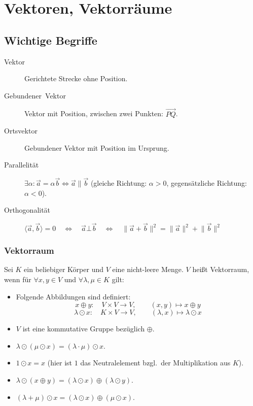 \chapter{Vektoren, Vektorräume}



\section{Wichtige Begriffe}
\begin{description}
  \item [{Vektor}]
	Gerichtete Strecke ohne Position.
  \item [{Gebundener~Vektor}] 
	Vektor mit Position, zwischen zwei Punkten: $\overrightarrow{PQ}$.
  \item [{Ortsvektor}] 
	Gebundener Vektor mit Position im Ursprung.
  \item [{Parallelität}] 
	$\exists\alpha : \vec{a} = \alpha\vec{b} \iff \vec{a} \| \vec{b}$
	(gleiche Richtung: $\alpha>0$, gegensätzliche Richtung: $\alpha<0$).
  \item [{Orthogonalität}] 
	$\langle \vec{a},\vec{b} \rangle = 0
	  \quad\iff\quad
	  \vec{a}\bot\vec{b}
	  \quad\iff\quad
	  \lVert \vec{a}+\vec{b} \rVert^2 = \lVert\vec{a}\rVert^2 + \lVert\vec{b}\rVert^2$
\end{description}

\subsection{Vektorraum}

Sei $K$ ein beliebiger Körper und $V$ eine nicht-leere Menge.
$V$ heißt Vektorraum, wenn für $\forall x,y\in V$ und $\forall\lambda,\mu\in K$ gilt:

\begin{itemize}
  \item Folgende Abbildungen sind definiert:
    \[ x       \oplus y : \quad V\times V \to V, \qquad(x,y)      \mapsto x\oplus y \]
    \[ \lambda \odot  x : \quad K\times V \to V, \qquad(\lambda,x)\mapsto\lambda\odot x \]
  \item $V$ ist eine kommutative Gruppe bezüglich $\oplus$.
  \item $\lambda\odot(\mu\odot x)=(\lambda\cdot\mu)\odot x$.
  \item $1\odot x=x$ (hier ist $1$ das Neutralelement bzgl.~der Multiplikation aus $K$).
  \item $\lambda\odot(x\oplus y)=(\lambda\odot x)\oplus(\lambda\odot y)$.
  \item $(\lambda+\mu)\odot x=(\lambda\odot x)\oplus(\mu\odot x)$.
\end{itemize}

